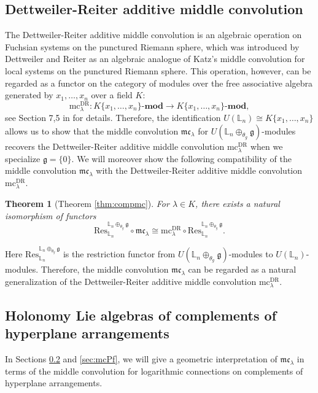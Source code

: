 \documentclass[a4paper,12pt]{article}
\newtheorem{thm}{Theorem}[section]
\theoremstyle{definition}
\theoremstyle{remark}
\begin{document}
\subsection{Dettweiler-Reiter additive middle convolution}
The Dettweiler-Reiter additive middle convolution is an algebraic operation on Fuchsian systems on the punctured Riemann sphere, which was introduced by Dettweiler and Reiter \cite{DR00,DR07} as an algebraic analogue of Katz's middle convolution for local systems on the punctured Riemann sphere.
This operation, however, can be 
regarded as a functor on the category of modules over the free associative algebra
generated by $x_{1},\ldots,x_{n}$ over a field $K$:
\[
	\mathrm{mc}_{\lambda}^{\mathrm{DR}}\colon K\{x_{1},\ldots,x_{n}\}\text{-}\mathrm{\mathbf{mod}}\to K\{x_{1},\ldots,x_{n}\}\text{-}\mathrm{\mathbf{mod}},
\]
see Section 7,5 in \cite{Harbook} for details.
Therefore, the identification $U(\mathbb{L}_{n})\cong K\{x_{1},\ldots,x_{n}\}$
allows us to show that the middle convolution $\mathfrak{mc}_{\lambda}$ for $U(\mathbb{L}_{n}\oplus_{\theta_{g}} \mathfrak{g})$-modules
recovers the Dettweiler-Reiter additive middle convolution $\mathrm{mc}_{\lambda}^{\mathrm{DR}}$
when we specialize $\mathfrak{g}=\{0\}$.
We will moreover show the following compatibility of the middle convolution $\mathfrak{mc}_{\lambda}$ with the 
Dettweiler-Reiter additive middle convolution $\mathrm{mc}_{\lambda}^{\mathrm{DR}}$.
\begin{thm}[Theorem \ref{thm:compmc}]
For $\lambda\in K$, there exists a natural isomorphism of functors
\[
	\mathrm{Res}_{\mathbb{L}_{n}}^{\mathbb{L}_{n}\oplus_{\theta_{g}}\mathfrak{g}}\circ \mathfrak{mc}_{\lambda}
	\cong \mathrm{mc}^{\mathrm{DR}}_{\lambda}\circ \mathrm{Res}_{\mathbb{L}_{n}}^{\mathbb{L}_{n}\oplus_{\theta_{g}}\mathfrak{g}}.
\]
\end{thm}
Here $\mathrm{Res}_{\mathbb{L}_{n}}^{\mathbb{L}_{n}\oplus_{\theta_{g}}\mathfrak{g}}$ is the 
restriction functor from $U(\mathbb{L}_{n}\oplus_{\theta_{g}} \mathfrak{g})$-modules 
to $U(\mathbb{L}_{n})$-modules.
Therefore, the middle convolution $\mathfrak{mc}_{\lambda}$ can be 
regarded as a natural generalization of the Dettweiler-Reiter 
additive middle convolution $\mathrm{mc}_{\lambda}^{\mathrm{DR}}$.
\subsection{Holonomy Lie algebras of complements of hyperplane arrangements}
\label{sec:holonomy}
In Sections \ref{sec:holonomy} and \ref{sec:mcPf},
we will give a geometric interpretation of $\mathfrak{mc}_{\lambda}$
in terms of the middle convolution for logarithmic connections on complements of hyperplane arrangements.
\end{document}
